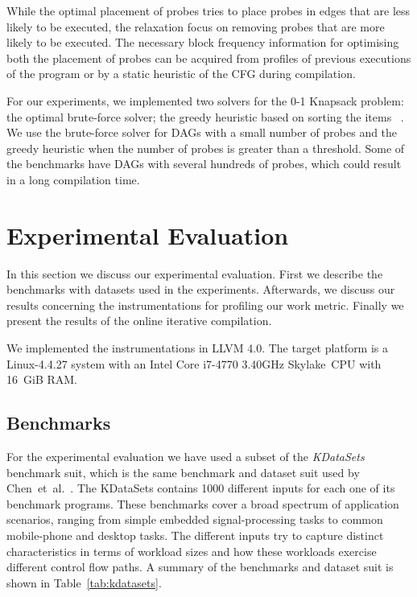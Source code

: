 \documentclass[sigplan,10pt]{acmart}
\newcommand{\etal}{et~al.}
\newcommand{\itercomp}{{iterative compilation}}
\begin{document}
While the optimal placement of probes tries to place probes in edges that are less likely to be executed, the relaxation focus on removing probes that are more likely to be executed.
The necessary block frequency information for optimising both the placement of probes can be acquired from profiles of previous executions of the program or by a static heuristic of the CFG during compilation.

For our experiments, we implemented two solvers for the 0-1 Knapsack problem:
the optimal brute-force solver;
the greedy heuristic based on sorting the items ~\cite{dantzig57}.
We use the brute-force solver for DAGs with a small number of probes and the greedy heuristic when the number of probes is greater than a threshold.
Some of the benchmarks have DAGs with several hundreds of probes, which could result in a long compilation time.

\section{Experimental Evaluation}

In this section we discuss our experimental evaluation.
First we describe the benchmarks with datasets used in the experiments.
Afterwards, we discuss our results concerning the instrumentations for profiling our work metric.
Finally we present the results of the online {\itercomp}.

We implemented the instrumentations in LLVM 4.0.
The target platform is a Linux-4.4.27 system with an Intel Core i7-4770 3.40GHz Skylake~CPU with 16~GiB RAM.

\subsection{Benchmarks}

For the experimental evaluation we have used a subset of the \textit{KDataSets} benchmark suit, which is the same benchmark and dataset suit used by Chen~\etal~\cite{chen10,chen12a}.
The KDataSets contains 1000 different inputs for each one of its benchmark programs.
These benchmarks cover a broad spectrum of application scenarios, ranging from simple embedded signal-processing tasks to common mobile-phone and desktop tasks.
The different inputs try to capture distinct characteristics in terms of workload sizes and how these workloads exercise different control flow paths.
A summary of the benchmarks and dataset suit is shown in Table~\ref{tab:kdatasets}.
\end{document}
